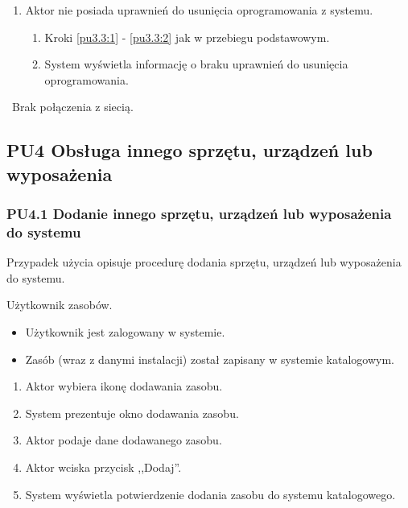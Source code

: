 \begin{enumerate}
\item Aktor nie posiada uprawnień do usunięcia oprogramowania z systemu.
	\begin{enumerate}[label*=\arabic*.]
		\item Kroki \ref{pu3.3:1} - \ref{pu3.3:2} jak w przebiegu podstawowym.
		\item System wyświetla informację o braku uprawnień do usunięcia oprogramowania.
	\end{enumerate}
\end{enumerate}

\
Brak połączenia z siecią.

\subsection{PU4 Obsługa innego sprzętu, urządzeń lub wyposażenia} \label{pu4}
\subsubsection{PU4.1 Dodanie innego sprzętu, urządzeń lub wyposażenia do systemu}

Przypadek użycia opisuje procedurę dodania sprzętu, urządzeń lub wyposażenia do systemu.

Użytkownik zasobów.

\begin{itemize}
\item Użytkownik jest zalogowany w systemie.
\end{itemize}

\begin{itemize}
\item Zasób (wraz z danymi instalacji) został zapisany w systemie katalogowym.
\end{itemize}

\begin{enumerate}
\item \label{pu4.1:1} Aktor wybiera ikonę dodawania zasobu.
\item System prezentuje okno dodawania zasobu.
\item Aktor podaje dane dodawanego zasobu.
\item \label{pu4.1:4} Aktor wciska przycisk ,,Dodaj''.
\item System wyświetla potwierdzenie dodania zasobu do systemu katalogowego.
\end{enumerate}

